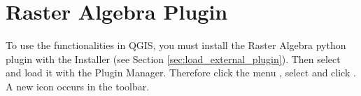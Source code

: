 
\section{Raster Algebra Plugin}\label{sec:ftools}



To use the functionalities in QGIS, you must install the Raster Algebra
python plugin with the  Installer
(see Section \ref{sec:load_external_plugin}). Then select and load it
with the Plugin Manager. Therefore click the menu  \arrow
{}, select  and click
. A new  icon occurs
in the toolbar.
